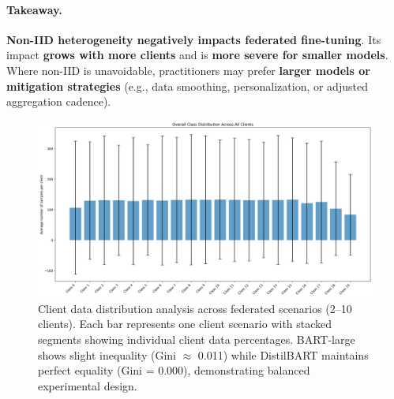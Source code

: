 \documentclass[conference]{IEEEtran}
\begin{document}
\paragraph{Takeaway.} \textbf{Non-IID heterogeneity negatively impacts federated fine-tuning}. Its impact \textbf{grows with more clients} and is \textbf{more severe for smaller models}. Where non-IID is unavoidable, practitioners may prefer \textbf{larger models or mitigation strategies} (e.g., data smoothing, personalization, or adjusted aggregation cadence).

\begin{figure}[H]
    \centering
    \includegraphics[width=\linewidth]{../analysis_results/classification/federated/client_distributions/overall_class_distribution.png}
    \caption{Client data distribution analysis across federated scenarios (2--10 clients). Each bar represents one client scenario with stacked segments showing individual client data percentages. BART-large shows slight inequality (Gini $\approx$ 0.011) while DistilBART maintains perfect equality (Gini = 0.000), demonstrating balanced experimental design.}
    \label{fig:client_data_distribution}
\end{figure}
\end{document}
